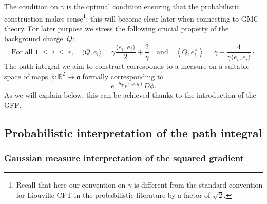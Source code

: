 \documentclass[AHL,Unicode,longabstracts,published]{cedram}
\renewcommand{\leq}{\;\leqslant\;}
\newcommand{\frkg}{\mathfrak{g}}
\newcommand{\frka}{\mathfrak{a}}
\newcommand{\R}{\mathbb{R}}
\newcommand{\ps}[1]{\langle #1 \rangle}
\begin{document}
The condition on $\gamma$ is the optimal condition ensuring that the probabilistic construction makes sense\footnote{Recall that here our convention on $\gamma$ is different from the standard convention for Liouville CFT in the probabilistic literature by a factor of $\sqrt{2}$.}: this will become clear later when connecting to GMC theory. For later purpose we stress the following crucial property of the background charge~$Q$:
\begin{equation}\label{eq:propQ}
\text{For all } 1 \leq i \leq r,\quad \langle Q, e_i \rangle =\gamma\frac{\ps{e_i,e_i}}{2}+\frac{2}{\gamma}\quad\text{and}\quad\left\langle Q, e_i^\vee \right\rangle =\gamma+\frac{4}{\gamma\ps{e_i,e_i}}\cdot
\end{equation}
The path integral we aim to construct corresponds to a measure on a suitable space of maps $\phi: \R^2\to \frka$ formally corresponding to
\begin{equation}\label{TQFTPI}
e^{- S_{T,\frkg}(\phi,g)}D\phi.
\end{equation}
As we will explain below, this can be achieved thanks to the introduction of the GFF.

\subsection{Probabilistic interpretation of the path integral}


\subsubsection{Gaussian measure interpretation of the squared gradient}
\end{document}
